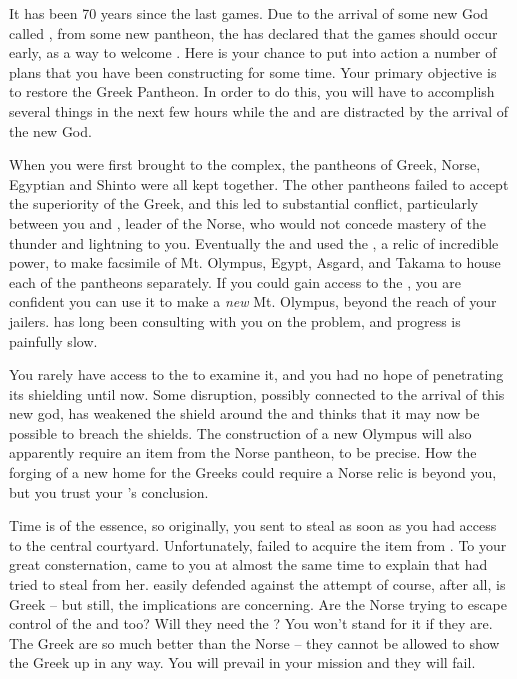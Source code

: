 \documentclass[char]{guardians}
\begin{document}
It has been 70 years since the last games.  Due to the arrival of some new God called \cUnity{}, from some new pantheon, the \cCaretaker{} has declared that the games should occur early, as a way to welcome \cUnity{\them}. Here is your chance to put into action a number of plans that you have been constructing for some time. Your primary objective is to restore the Greek Pantheon. In order to do this, you will have to accomplish several things in the next few hours while the \cCaretaker{} and \cWarden{} are distracted by the arrival of the new God.

When you were first brought to the complex, the pantheons of Greek, Norse, Egyptian and Shinto were all kept together. The other pantheons failed to accept the superiority of the Greek, and this led to substantial conflict, particularly between you and \cOdin{}, leader of the Norse, who would not concede mastery of the thunder and lightning to you. Eventually the \cCaretaker{} and \cWarden{} used the \stone, a relic of incredible power, to make facsimile of Mt. Olympus, Egypt, Asgard, and Takama to house each of the pantheons separately. If you could gain access to the \stone, you are confident you can use it to make a \emph{new} Mt. Olympus, beyond the reach of your jailers. \cHephaestus{} has long been consulting with you on the problem, and progress is painfully slow. 

You rarely have access to the \stone{} to examine it, and you had no hope of penetrating its shielding until now. Some disruption, possibly connected to the arrival of this new god, has weakened the shield around the \stone{} and \cHephaestus{} thinks that it may now be possible to breach the shields. The construction of a new Olympus will also apparently require an item from the Norse pantheon, \iHammer{\MYname} to be precise. How the forging of a new home for the Greeks could require a Norse relic is beyond you, but you trust your \cHephaestus{\offspring}'s conclusion.

Time is of the essence, so originally, you sent \cPandora{} to steal \iHammer{\MYname} as soon as you had access to the central courtyard. Unfortunately, \cPandora{\they} failed to acquire the item from \cHel{}. To your great consternation, \cHera{} came to you at almost the same time to explain that \cVal{} had tried to steal \iSandals{\MYname} from her. \cHera{} easily defended against the attempt of course, after all, \cHera{\they} is Greek -- but still, the implications are concerning. Are the Norse trying to escape control of the \cCaretaker{} and \cWarden{} too? Will they need the \stone? You won't stand for it if they are. The Greek are so much better than the Norse -- they cannot be allowed to show the Greek up in any way. You will prevail in your mission and they will fail.
\end{document}
